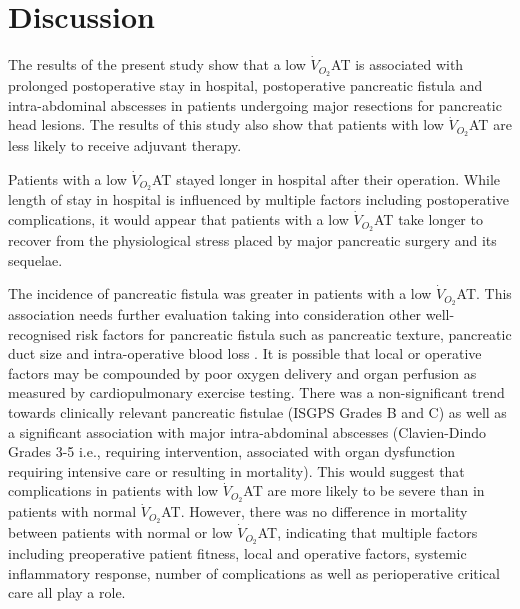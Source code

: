 

\clearpage

\section{Discussion}
The results of the present study show that a low $\dot{V}_{O_2}$AT is associated with prolonged postoperative stay in hospital, postoperative pancreatic fistula and intra-abdominal abscesses in patients undergoing major resections for pancreatic head lesions. 
The results of this study also show that patients with low $\dot{V}_{O_2}$AT are less likely to receive adjuvant therapy. 


Patients with a low $\dot{V}_{O_2}$AT stayed longer in hospital after their operation. 
While length of stay in hospital is influenced by multiple factors including postoperative complications, it would appear that patients with a low $\dot{V}_{O_2}$AT take longer to recover from the physiological stress placed by major pancreatic surgery and its sequelae.

The incidence of pancreatic fistula was greater in patients with a low $\dot{V}_{O_2}$AT. 
This association needs further evaluation taking into consideration other well-recognised risk factors for pancreatic fistula such as pancreatic texture, pancreatic duct size and intra-operative blood loss \parencite{braga_prognostic_2011, pratt_possum_2008, winter_1423_2006}. 
It is possible that local or operative factors may be compounded by poor oxygen delivery and organ perfusion as measured by cardiopulmonary exercise testing. 
There was a non-significant trend towards clinically relevant pancreatic fistulae (ISGPS Grades B and C) as well as a significant association with major intra-abdominal abscesses (Clavien-Dindo Grades 3-5 i.e., requiring intervention, associated with organ dysfunction requiring intensive care or resulting in mortality). 
This would suggest that complications in patients with low $\dot{V}_{O_2}$AT are more likely to be severe than in patients with normal $\dot{V}_{O_2}$AT. 
However, there was no difference in mortality between patients with normal or low $\dot{V}_{O_2}$AT, indicating that multiple factors including preoperative patient fitness, local and operative factors, systemic inflammatory response, number of complications as well as perioperative critical care all play a role.

